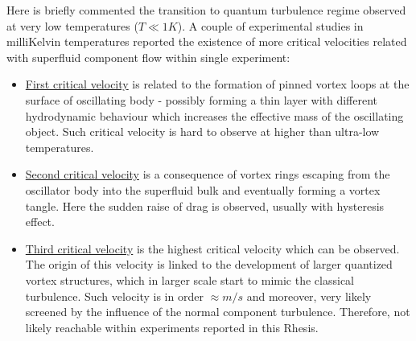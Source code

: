 Here is briefly commented the transition to quantum turbulence regime observed at very low temperatures ($T \ll 1\unit{K}$). A couple of experimental studies in milliKelvin temperatures reported \cite{crit-velocity} the existence of more critical velocities related with superfluid component flow within single experiment:

\begin{itemize}
	\item \underline{First critical velocity} is related to the formation of pinned vortex loops at the surface of oscillating body - possibly forming a thin layer with different hydrodynamic behaviour which increases the effective mass of the oscillating object. Such critical velocity is hard to observe at higher than ultra-low temperatures.

	\item \underline{Second critical velocity} is a consequence of vortex rings escaping from the oscillator body into the superfluid bulk and eventually forming a vortex tangle. Here the sudden raise of drag is observed, usually with hysteresis effect.

	\item \underline{Third critical velocity} is the highest critical velocity which can be observed. The origin of this velocity is linked to the development of larger quantized vortex structures, which in larger scale start to mimic the classical turbulence. Such velocity is in order $\approx \unit{m/s}$ and moreover, very likely screened by the influence of the normal component turbulence. Therefore, not likely reachable within experiments reported in this Rhesis.
\end{itemize}

%

